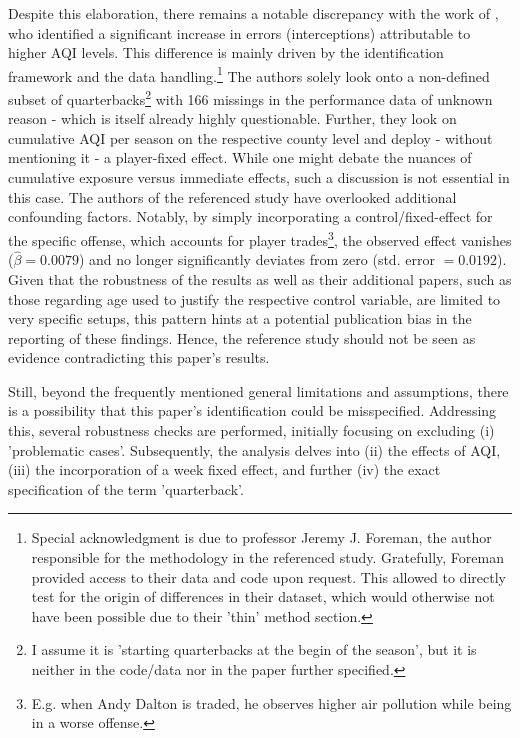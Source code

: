 \documentclass[12pt,a4paper]{article}
\begin{document}
{Despite this elaboration, there remains a notable discrepancy with the work of \citet{heintz2022}, who identified a significant increase in errors (interceptions) attributable to higher AQI levels. This difference is mainly driven by the identification framework and the data handling.\footnote{Special acknowledgment is due to professor Jeremy J. Foreman, the author responsible for the methodology in the referenced study. Gratefully, Foreman provided access to their data and code upon request. This allowed to directly test for the origin of differences in their dataset, which would otherwise not have been possible due to their 'thin' method section.} The authors solely look onto a non-defined subset of quarterbacks\footnote{I assume it is 'starting quarterbacks at the begin of the season', but it is neither in the code/data nor in the paper further specified.} with 166 missings in the performance data of unknown reason - which is itself already highly questionable. Further, they look on cumulative AQI per season on the respective county level and deploy - without mentioning it - a player-fixed effect. While one might debate the nuances of cumulative exposure versus immediate effects, such a discussion is not essential in this case. The authors of the referenced study have overlooked additional confounding factors. Notably, by simply incorporating a control/fixed-effect for the specific offense, which accounts for player trades\footnote{E.g. when Andy Dalton is traded, he observes higher air pollution while being in a worse offense.}, the observed effect vanishes ($\hat{\beta} = 0.0079$) and no longer significantly deviates from zero (std. error $= 0.0192$). Given that the robustness of the results as well as their additional papers, such as those regarding age used to justify the respective control variable, are limited to very specific setups, this pattern hints at a potential publication bias in the reporting of these findings. Hence, the reference study should not be seen as evidence contradicting this paper's results. 

Still, beyond the frequently mentioned general limitations and assumptions, there is a possibility that this paper's identification could be misspecified. Addressing this, several robustness checks are performed, initially focusing on excluding (i) 'problematic cases'. Subsequently, the analysis delves into (ii) the effects of AQI, (iii) the incorporation of a week fixed effect, and further (iv) the exact specification of the term 'quarterback'. 

}
\end{document}
